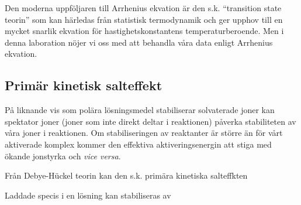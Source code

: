 Den moderna uppföljaren till Arrhenius ekvation är den s.k. ``transition
state teorin'' som kan härledas från statistisk termodynamik och ger
upphov till en mycket snarlik ekvation för hastighetskonstantens
temperaturberoende. Men i denna laboration nöjer vi oss med att behandla
våra data enligt Arrhenius ekvation.

\subsection{Primär kinetisk salteffekt}
På liknande vis som polära lösningsmedel stabiliserar
solvaterade joner kan spektator joner (joner som inte
direkt deltar i reaktionen) påverka stabiliteten av våra joner i
reaktionen. Om stabiliseringen av reaktanter är större än för vårt
aktiverade komplex kommer den effektiva aktiveringsenergin att stiga med
ökande jonstyrka och \emph{vice versa}.

Från Debye-Hückel teorin kan den s.k. primära kinetiska
salteffkten 


Laddade specis i en lösning kan stabiliseras av  

